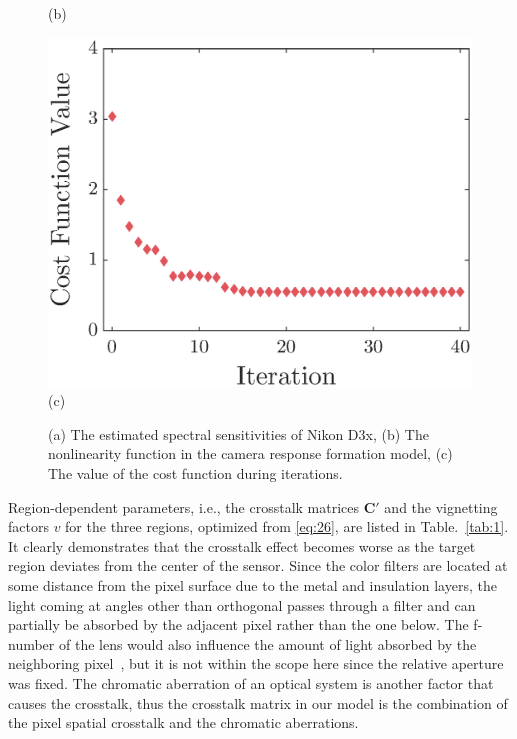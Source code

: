 \documentclass[9pt,twocolumn,twoside]{osajnl}
\providecommand{\DIFaddbeginFL}{} %
\providecommand{\DIFaddendFL}{} %
\providecommand{\DIFdelbeginFL}{} %
\providecommand{\DIFdelendFL}{} %
\begin{document}
\begin{figure}[tbp]
\begin{minipage}[b]{0.5\linewidth}
		(b)
	\end{minipage}%
	\begin{minipage}[b]{0.5\linewidth}
		\centering
		\DIFdelbeginFL %
\DIFdelendFL \DIFaddbeginFL \includegraphics[width=\linewidth]{Fig10c}\DIFaddendFL \\
		(c)
	\end{minipage}
	\caption{(a) The estimated spectral sensitivities of Nikon D3x, (b) The nonlinearity function in the camera response formation model, (c) The value of the cost function during iterations.}
	\DIFdelbeginFL %
\DIFdelendFL \DIFaddbeginFL \label{fig:10}
\DIFaddendFL \end{figure}

Region-dependent parameters, i.e., the crosstalk matrices $\mathbf{C}'$ and the vignetting factors $v$ for the three regions, optimized from \eqref{eq:26}, are listed in Table.~\ref{tab:1}. It clearly demonstrates that the crosstalk effect becomes worse as the target region deviates from the center of the sensor. Since the color filters are located at some distance from the pixel surface due to the metal and insulation layers, the light coming at angles other than orthogonal passes through a filter and can partially be absorbed by the adjacent pixel rather than the one below. The f-number of the lens would also influence the amount of light absorbed by the neighboring pixel~\cite{Agranov:03}, but it is not within the scope here since the relative aperture was fixed. The chromatic aberration of an optical system is another factor that causes the crosstalk, thus the crosstalk matrix in our model is the combination of the pixel spatial crosstalk and the chromatic aberrations.
\end{document}
